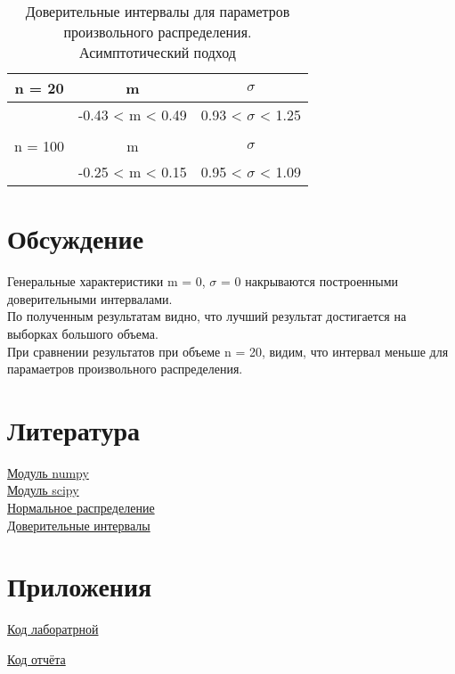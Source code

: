 \documentclass[a4]{article}
\begin{document}
		\begin{table}[h!]
			
			\caption{Доверительные интервалы для параметров произвольного распределения. Асимптотический подход}
			\label{tab:my_label}
			\begin{center}
				\vspace{5mm}
				
				\begin{tabular}{|c|c|c|}
					\hline
					n = 20 & m & $\sigma$\\
					\hline
					& -0.43 < m < 0.49 & 0.93 < $\sigma$ < 1.25\\ 
					\hline
					& & \\
					\hline
					n = 100 & m & $\sigma$\\
					\hline
					& -0.25 < m < 0.15 & 0.95 < $\sigma$ < 1.09\\
					\hline
				\end{tabular}
			\end{center}
		\end{table}

	\section{Обсуждение}
		Генеральные характеристики m = 0, $\sigma$ = 0 накрываются построенными доверительными интервалами.\\
		
		По полученным результатам видно, что лучший результат достигается на выборках большого объема.\\
		При сравнении результатов при объеме n = 20, видим, что интервал меньше для парамаетров произвольного распределения.
		
	\section{Литература}
	
	\href{https://physics.susu.ru/vorontsov/language/numpy.html}{Модуль numpy}\\
	
	\href{https://www.scipy.org/}{Модуль scipy}\\
	
	\href{https://ru.wikipedia.org/wiki/%D0%9D%D0%BE%D1%80%D0%BC%D0%B0%D0%BB%D1%8C%D0%BD%D0%BE%D0%B5_%D1%80%D0%B0%D1%81%D0%BF%D1%80%D0%B5%D0%B4%D0%B5%D0%BB%D0%B5%D0%BD%D0%B8%D0%B5}{Нормальное распределение}\\
	
	\href{http://mit.spbau.ru/sewiki/images/a/a1/Cis.pdf}{Доверительные интервалы}\\
	
	
	\section{Приложения}
	
	\href{https://github.com/LuciusGen/Matstat/blob/master/Lab8/Lab8.py}{Код лаборатрной}
	
	\href{https://github.com/LuciusGen/Matstat/blob/master/Lab8/lab8.tex}{Код отчёта}
	
\end{document}
